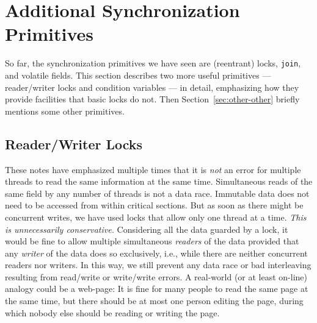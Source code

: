 \documentclass[10pt]{article}
\begin{document}
\section{Additional Synchronization Primitives}
\label{sec:other-synch}

So far, the synchronization primitives we have seen are (reentrant)
locks, {\tt join}, and volatile fields.  This section describes two
more useful primitives --- reader/writer locks and condition variables
--- in detail, emphasizing how they provide facilities that basic
locks do not.  Then Section~\ref{sec:other-other} briefly mentions some other
primitives.

\subsection{Reader/Writer Locks}

These notes have emphasized multiple times that it is \emph{not} an
error for multiple threads to read the same information
at the same time.  Simultaneous reads of the same field by any number
of threads is not a data race.  Immutable data does not need to be
accessed from within critical sections.  But as soon as there might be
concurrent writes, we have used locks that allow only one thread at a
time.  \emph{This is unnecessarily conservative.}  Considering all the
data guarded by a lock, it would be fine to allow multiple
simultaneous \emph{readers} of the data provided that any
\emph{writer} of the data does so exclusively, i.e., while there are
neither concurrent readers nor writers.  In this way, we still prevent
any data race or bad interleaving resulting from read/write or
write/write errors.  A real-world (or at least on-line) analogy could
be a web-page: It is fine for many people to read the same page at the
same time, but there should be at most one person editing the page,
during which nobody else should be reading or writing the page.
\end{document}
